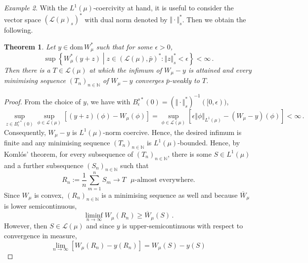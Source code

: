 \documentclass[
	paper=A4,
	pagesize=auto,
	fontsize=12pt
]{scrartcl}
\theoremstyle{plain}
\newtheorem{theorem}{Theorem}[section]
\theoremstyle{remark}
\newtheorem{example}[theorem]{Example}
\theoremstyle{definition}
\begin{document}
\begin{example}
With the $L^1(\mu)$-coercivity at hand, it is useful to consider the vector space $(\mathcal{L}(\mu)_s)^*$ with dual norm denoted by $\Vert \cdot \Vert_s^*$.
Then we obtain the following.
%
\begin{theorem}
Let $y \in \mathrm{dom}\, W_\mu^*$ such that for some $\epsilon > 0$,
%
\begin{equation}
\sup\left\{ W_\mu^* \left( y + z \right) \middle| z \in (\mathcal{L}(\mu), \bar{p})^*: \left\Vert z \right\Vert_s^* < \epsilon \right\}
<
\infty \, .
\end{equation}
%
Then there is a $T \in \mathcal{L}(\mu)$ at which the infimum of $W_\mu - y$ is attained and every minimising sequence $(T_n)_{n \in \mathbb{N}}$ of $W_\mu - y$ converges $\bar{p}$-weakly to $T$.
\end{theorem}
\begin{proof}
From the choice of $y$, we have with $B^{s\ast}_\epsilon(0) = (\Vert \cdot \Vert_s^*)^{-1}([0,\epsilon))$,
%
\begin{equation}
\sup_{z \in B^{s\ast}_\epsilon(0)}
\sup_{\phi \in \mathcal{L}(\mu)}
\left[
\left( y + z \right) \left( \phi \right)
-
W_\mu \left( \phi \right)
\right]
=
\sup_{\phi \in \mathcal{L}(\mu)}
\left[
\epsilon \left\Vert \phi \right\Vert_{L^1(\mu)}
-
\left( W_\mu - y \right) \left( \phi \right)
\right]
<
\infty \, .
\end{equation}
%
Consequently, $W_\mu - y$ is $L^1(\mu)$-norm coercive.
Hence, the desired infimum is finite and any minimising sequence $(T_n)_{n \in \mathbb{N}}$ is $L^1(\mu)$-bounded.
Hence, by Komlós' theorem, for every subsequence of $(T_n)_{n \in \mathbb{N}}$, there is some $S \in L^1(\mu)$ and a further subsequence $(S_n)_{n \in \mathbb{N}}$ such that
%
\begin{equation}
R_n := \frac{1}{n} \sum_{m = 1}^n S_m \to T \text{ $\mu$-almost everywhere}.
\end{equation}
%
Since $W_\mu$ is convex, $(R_n)_{n \in \mathbb{N}}$ is a minimising sequence as well and because $\overline{W}_\mu$ is lower semicontinuous,
%
\begin{equation}
\liminf_{n \to \infty} W_\mu \left( R_n \right)
\ge
\overline{W}_\mu \left( S \right) \, .
\end{equation}
%
However, then $S \in \mathcal{L}(\mu)$ and since $y$ is upper-semicontinuous with respect to convergence in measure,
%
\begin{equation}
\lim_{n \to \infty} \left[ W_\mu \left( R_n \right) - y \left( R_n \right) \right]
=
W_\mu \left( S \right) - y \left( S \right)

\end{equation}
\end{proof}
\end{example}
\end{document}
